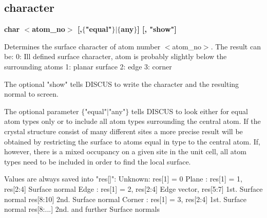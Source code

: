 \subsection*{character}
{\bf char $ <$atom\_no$> $ [,$ \{$"equal"$\} $$| $$ \{$any$\} $] [, "show"] \par }
\par
\vspace{3pt}
Determines the surface character of atom number $ <$atom\_no$> $. 
The result can be: 
0: Ill defined surface character, atom is probably slightly below 
       the surrounding atoms 
1: planar surface 
2: edge 
3: corner 
\par
The optional "show" tells DISCUS to write the character and 
the resulting normal to screen. 
\par
The optional parameter $ \{$"equal"$| $"any"$\} $ tells DISCUS to look either 
for equal atom types only or to include all atom types surrounding 
the central atom. If the crystal structure consist of many different 
sites a more precise result will be obtained by restricting the 
surface to atoms equal in type to the central atom. If, however, 
there is a mixed occupancy on a given site in the unit cell, all 
atom types need to be included in order to find the local surface. 
\par
Values are always saved into "res[]": 
Unknown: res[1] = 0 
Plane  : res[1] = 1, res[2:4]   Surface normal 
Edge   : res[1] = 2, res[2:4]   Edge vector, 
                     res[5:7]   1st. Surface normal 
                     res[8:10]  2nd. Surface normal 
Corner : res[1] = 3, res[2:4]   1st. Surface normal 
                     res[8:...] 2nd. and further Surface normals 
